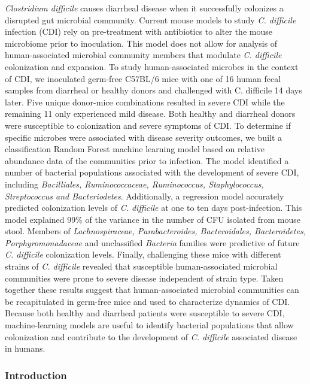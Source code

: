 \documentclass[11pt,]{article}
\begin{document}
\emph{Clostridium difficile} causes diarrheal disease when it
successfully colonizes a disrupted gut microbial community. Current
mouse models to study \emph{C. difficile} infection (CDI) rely on
pre-treatment with antibiotics to alter the mouse microbiome prior to
inoculation. This model does not allow for analysis of human-associated
microbial community members that modulate \emph{C. difficile}
colonization and expansion. To study human-associated microbes in the
context of CDI, we inoculated germ-free C57BL/6 mice with one of 16
human fecal samples from diarrheal or healthy donors and challenged with
C. difficile 14 days later. Five unique donor-mice combinations resulted
in severe CDI while the remaining 11 only experienced mild disease. Both
healthy and diarrheal donors were susceptible to colonization and severe
symptoms of CDI. To determine if specific microbes were associated with
disease severity outcomes, we built a classification Random Forest
machine learning model based on relative abundance data of the
communities prior to infection. The model identified a number of
bacterial populations associated with the development of severe CDI,
including \emph{Bacilliales, Ruminococcaceae, Ruminococcus,
Staphylococcus, Streptococcus and Bacteriodetes}. Additionally, a
regression model accurately predicted colonization levels of \emph{C.
difficile} at one to ten days post-infection. This model explained 99\%
of the variance in the number of CFU isolated from mouse stool. Members
of \emph{Lachnospiraceae, Parabacteroides, Bacteroidales, Bacteroidetes,
Porphyromonadaceae} and unclassified \emph{Bacteria} families were
predictive of future \emph{C. difficile} colonization levels. Finally,
challenging these mice with different strains of \emph{C. difficile}
revealed that susceptible human-associated microbial communities were
prone to severe disease independent of strain type. Taken together these
results suggest that human-associated microbial communities can be
recapitulated in germ-free mice and used to characterize dynamics of
CDI. Because both healthy and diarrheal patients were susceptible to
severe CDI, machine-learning models are useful to identify bacterial
populations that allow colonization and contribute to the development of
\emph{C. difficile} associated disease in humans.

\newpage

\subsubsection{Introduction}\label{introduction}
\end{document}
